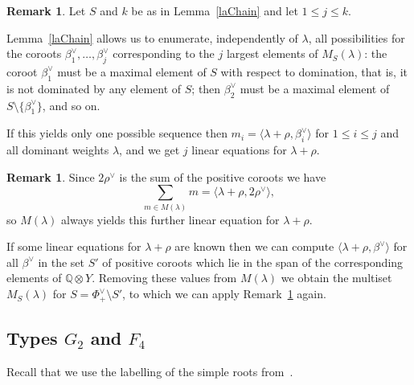 \documentclass[11pt,a4paper]{article}
\theoremstyle{plain}
\theoremstyle{definition}
\newtheorem{Rem}[Thm]{Remark}
\newcommand{\Q}{\mathbb{Q}}
\begin{document}
\begin{Rem}\label{remChain}
Let $S$ and $k$ be as in Lemma~\ref{laChain} and let $1 \leq j \leq k$.

Lemma~\ref{laChain} allows us to enumerate, independently of $\lambda$,
all possibilities for the coroots $\beta_1^\vee, \ldots, \beta_j^\vee$
corresponding to the $j$ largest elements of $M_S(\lambda)$: the coroot
$\beta_1^\vee$ must be a maximal element of $S$ with respect to
domination, that is, it is not dominated by any element of $S$; then
$\beta_2^\vee$ must be a maximal element of $S \setminus
\{\beta_1^\vee\}$, and so on. 

If this yields only one possible sequence then 
$m_i = \langle \lambda+\rho, \beta_i^\vee \rangle$ for $1 \leq i \leq j$
and all dominant weights $\lambda$, and we get $j$ linear equations for 
$\lambda + \rho$.
\end{Rem}

\begin{Rem}\label{remSum}
Since $2\rho^\vee$ is the sum of the positive coroots we have 
\[ \sum_{m \in M(\lambda)} m = \langle \lambda + \rho, 2\rho^\vee \rangle,\]
so $M(\lambda)$ always yields this further linear equation for 
$\lambda + \rho$. 

If some linear equations for $\lambda + \rho$ are known then we can compute
$\langle \lambda+\rho, \beta^\vee \rangle$ for all $\beta^\vee$ in the
set $S'$ of positive coroots which lie in the span of the corresponding
elements of $\Q \otimes Y$. Removing these values from $M(\lambda)$ we obtain the
multiset $M_S(\lambda)$ for $S = \Phi^\vee_+ \setminus S'$, to which we
can apply Remark~\ref{remChain} again.
\end{Rem}

\subsection{Types $G_2$ and $F_4$}\label{secG2F4}

Recall that we use the labelling of the simple roots
from~\cite[Planches]{bou}.
\end{document}
